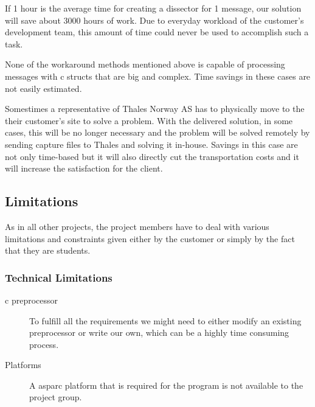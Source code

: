 If 1 hour is the average time for creating a \gls{dissector} for 1 message, our solution will save about 3000 hours of work. Due to everyday workload of the customer’s development team, this amount of time could never be used to accomplish such a task.

None of the workaround methods mentioned above is capable of processing messages with \Gls{c} \glspl{struct} that are big and complex. Time savings in these cases are not easily estimated.

Somestimes a representative of Thales Norway AS has to physically move to the their customer’s site to solve a problem. With the delivered solution, in some cases, this will be no longer necessary and the problem will be solved remotely by sending capture files to Thales and solving it in-house. Savings in this case are not only time-based but it will also directly cut the transportation costs and it will increase the satisfaction for the client.

\subsection{Limitations}
As in all other projects, the project members have to deal with various limitations and constraints given either by the customer or simply by the fact that they are students.

\subsubsection{Technical Limitations}
\begin{description}
	\item[\Gls{c} \gls{preprocessor}] To fulfill all the requirements we might need to
		either modify an existing \gls{preprocessor} or write our own, which can be
		a highly time consuming process.
	\item[Platforms] A \gls{asparc} platform that is required for the program is not
		available to the project group.
\end{description}

